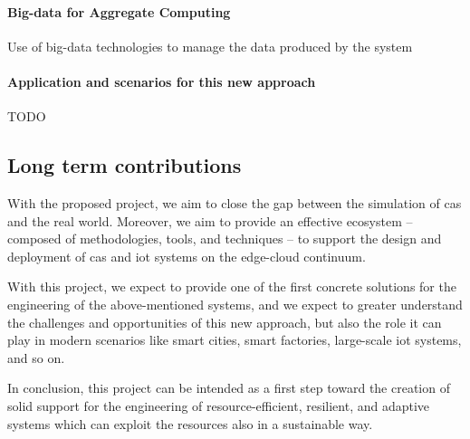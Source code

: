 \documentclass[12pt]{article}
\newcommand{\meta}[1]{{\color{blue}#1}}
\begin{document}
\paragraph{Big-data for Aggregate Computing}
\meta{
Use of big-data technologies to manage the data produced by the system

}

\paragraph{Application and scenarios for this new approach}
\meta{TODO}

\subsection{Long term contributions}
With the proposed project, we aim to close the gap between the simulation of \ac{cas} and the real world.
%
Moreover, we aim to provide an effective ecosystem -- composed of methodologies, tools, and techniques --
to support the design and deployment of \ac{cas} and \ac{iot} systems on the edge-cloud continuum.

With this project,
we expect to provide one of the first concrete solutions for the engineering of the above-mentioned systems,
and we expect to greater understand the challenges and opportunities of this new approach,
but also the role it can play in modern scenarios like smart cities, smart factories, large-scale \ac{iot} systems, and so on.

In conclusion,
this project can be intended as a first step toward the creation of solid support
for the engineering of resource-efficient, resilient, and adaptive systems
which can exploit the resources also in a sustainable way.
\end{document}
